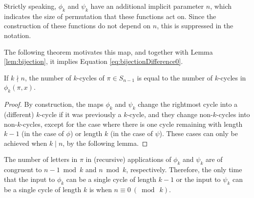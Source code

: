 \begin{note}
  Strictly speaking, $\phi_k$ and $\psi_k$ have an additional implicit
  parameter $n$, which indicates the size of permutation that these functions
  act on. Since the construction of these functions do not depend on $n$, this
  is suppressed in the notation.
\end{note}
The following theorem motivates this map,
and together with Lemma \ref{lem:bijection}, it implies Equation \ref{eq:bijectionDifference0}.
\begin{theorem}
  If $k \nmid n$, the number of $k$-cycles of $\pi \in S_{n-1}$ is equal to the number of $k$-cycles in
  $\phi_k(\pi,x)$.
\end{theorem}
\begin{proof}
  By construction, the maps $\phi_k$ and $\psi_k$ change the rightmost cycle
  into a (different) $k$-cycle if it was previously a $k$-cycle, and they
  change non-$k$-cycles into non-$k$-cycles, except for the case where there is
  one cycle remaining with length $k-1$ (in the case of $\phi$) or length $k$
  (in the case of $\psi$). These cases can only be achieved when $k \mid n$, by
  the following lemma.
\end{proof}
\begin{lemma}
  The number of letters in $\pi$ in (recursive) applications of $\phi_k$ and
  $\psi_k$ are of congruent to $n - 1 \bmod k$ and $n \bmod k$, respectively.
  Therefore, the only time that the input to $\phi_k$ can be a single cycle of
  length $k-1$ or the input to $\psi_k$ can be a single cycle of length $k$ is
  when $n \equiv 0\ (\bmod\ k)$.
\end{lemma}
